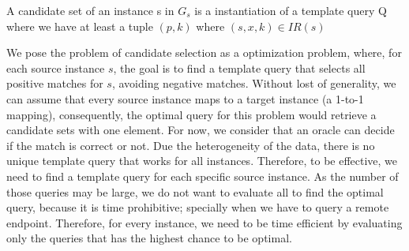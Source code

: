 \begin{definition}   A candidate set of an instance s in $G_s$ is a instantiation of a template query Q where we have at least a tuple $(p,k)$ where $(s,x,k) \in IR(s)$
\end{definition} 


We pose the problem of candidate selection as a optimization problem, where, for each source instance $s$, the goal is to find a template query that selects all positive matches for $s$, avoiding negative matches. Without lost of generality, we can assume that every source instance maps to a target instance (a 1-to-1 mapping), consequently, the optimal query for this problem would retrieve a candidate sets with one element. For now, we consider that an oracle can decide if the match is correct or not. Due the heterogeneity of the data, there is no unique template query that works for all instances. Therefore, to be effective, we need to find a template query for each specific source instance.  As the number of those queries may be large, we do not want to evaluate all to find the optimal query, because it is time prohibitive; specially when we have to query a remote endpoint. Therefore, for every instance, we need to be time efficient by evaluating only the queries that has the highest chance to be optimal.

